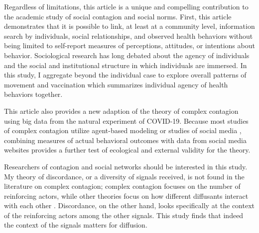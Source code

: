 Regardless of limitations, this article is a unique and compelling contribution
to the academic study of social contagion and social norms. First, this article
demonstrates that it is possible to link, at least at a community level,
information search by individuals, social relationships, and observed health
behaviors without being limited to self-report measures of perceptions,
attitudes, or intentions about behavior. Sociological research has long debated
about the agency of individuals and the social and institutional structure in
which individuals are immersed. In this study, I aggregate beyond the individual
case to explore overall patterns of movement and vaccination which summarizes
individual agency of health behaviors together.

This article also provides a new adaption of the theory of complex contagion
using big data from the natural experiment of COVID-19. Because most studies of
complex contagion utilize agent-based modeling or studies of social media
\citep{aralExerciseContagionGlobal2017,sprague_house17,bond_etal12,latane_etal94},
combining measures of actual behavioral outcomes with data from social media
websites provides a further test of ecological and external validity for the
theory.

Researchers of contagion and social networks should be interested in this study.
My theory of discordance, or a diversity of signals received, is not found in
the literature on complex contagion; complex contagion focuses on the number of
reinforcing actors, while other theories focus on how different diffusants
interact with each other
\citep{houghton20,goldbergSocialContagionAssociative2018,mason_etal07}.
Discordance, on the other hand, looks specifically at the context of the
reinforcing actors among the other signals. This study finds that indeed the
context of the signals matters for diffusion.